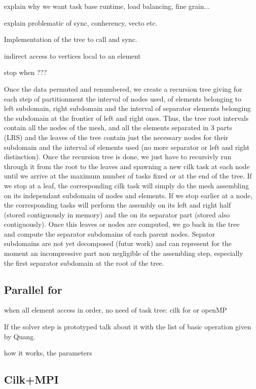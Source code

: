 \documentclass{IOS-Book-Article}
\begin{document}
explain why we want task base runtime, load balancing, fine grain...

explain problematic of sync, conherency, vecto etc.


Implementation of the tree to call and sync.

indirect access to vertices local to an element

stop when ???

Once the data permuted and renumbered, we create a recursion tree giving for each step of partitionment the interval of nodes used, of elements belonging to left subdomain,
right subdomain and the interval of separator elements belonging the subdomain at the frontier of left and right ones.
Thus, the tree root intervals contain all  the nodes of the mesh, and all the elements separated in 3 parts (LRS) and the leaves of the tree contain just the necessary nodes
for their subdomain and the interval of elements used (no more separator or left and right distinction).
Once the recursion tree is done, we just have to recursivly run through it from the root to the leaves and spawning a new cilk task at each node until we arrive at the maximum
number of tasks fixed or at the end of the tree. If we stop at a leaf, the corresponding cilk task will simply do the mesh assembling on its independant subdomain of nodes and
elements. If we stop earlier at a node, the corresponding tasks will perform the assembly on its left and right half (stored contiguously in memory) and the on its separator
part (stored also contiguously). Once this leaves or nodes are computed, we go back in the tree and compute the separator subdomains of each parent nodes.
Sepator subdomains are not yet decomposed (futur work) and can represent for the moment an incompressive part non negligible of the assembling step, especially the first
separator subdomain at the root of the tree.

\subsection{Parallel for}

when all element access in order, no need of task tree: cilk for or openMP

If the solver step is prototyped talk about it with the list of basic operation given by Quang.

how it works, the parameters


\subsection{Cilk+MPI}
\end{document}
